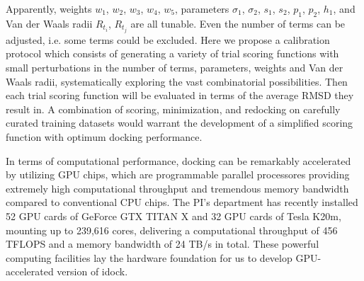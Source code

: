 \documentclass[a4paper,12pt]{article}
\begin{document}
Apparently, weights $w_1$, $w_2$, $w_3$, $w_4$, $w_5$, parameters $\sigma_1$, $\sigma_2$, $s_1$, $s_2$, $p_1$, $p_2$, $h_1$, and Van der Waals radii $R_{t_i}$, $R_{t_j}$ are all tunable. Even the number of terms can be adjusted, i.e. some terms could be excluded. Here we propose a calibration protocol which consists of generating a variety of trial scoring functions with small perturbations in the number of terms, parameters, weights and Van der Waals radii, systematically exploring the vast combinatorial possibilities. Then each trial scoring function will be evaluated in terms of the average RMSD they result in. A combination of scoring, minimization, and redocking on carefully curated training datasets would warrant the development of a simplified scoring function with optimum docking performance.

In terms of computational performance, docking can be remarkably accelerated by utilizing GPU chips, which are programmable parallel processores providing extremely high computational throughput and tremendous memory bandwidth compared to conventional CPU chips. The PI's department has recently installed 52 GPU cards of GeForce GTX TITAN X and 32 GPU cards of Tesla K20m, mounting up to 239,616 cores, delivering a computational throughput of 456 TFLOPS and a memory bandwidth of 24 TB/s in total. These powerful computing facilities lay the hardware foundation for us to develop GPU-accelerated version of idock.


\end{document}
